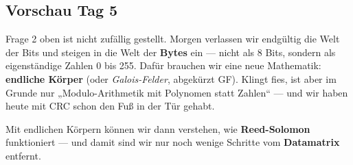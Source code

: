 \subsection*{Vorschau Tag 5}

Frage 2 oben ist nicht zufällig gestellt. Morgen verlassen wir
endgültig die Welt der Bits und steigen in die Welt der \textbf{Bytes}
ein — nicht als 8 Bits, sondern als eigenständige Zahlen 0 bis 255.
Dafür brauchen wir eine neue Mathematik: \textbf{endliche Körper}
(oder \emph{Galois-Felder}, abgekürzt GF). Klingt fies, ist aber im
Grunde nur „Modulo-Arithmetik mit Polynomen statt Zahlen“ — und wir
haben heute mit CRC schon den Fuß in der Tür gehabt.

Mit endlichen Körpern können wir dann verstehen, wie
\textbf{Reed-Solomon} funktioniert — und damit sind wir nur noch
wenige Schritte vom \textbf{Datamatrix} entfernt.

